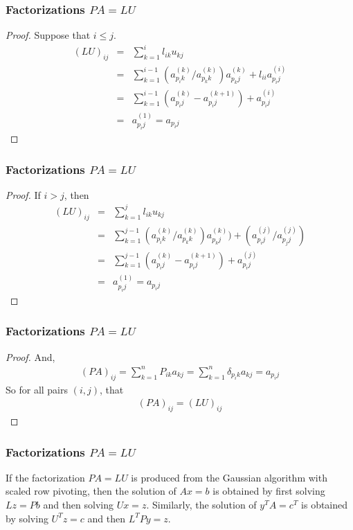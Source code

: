 \documentclass[notheorems,mathserif,table,compress]{beamer}  %
\begin{document}
\begin{frame}
\frametitle{Factorizations $PA=LU$} 
\begin{proof}
Suppose that $i\leq j$.
\begin{eqnarray*}
(LU)_{ij}&=&\sum_{k=1}^{i}l_{ik}u_{kj}\\
&=&\sum_{k=1}^{i-1}(a_{p_ik}^{(k)}/a_{p_kk}^{(k)})a_{p_kj}^{(k)}+l_{ii}a_{p_ij}^{(i)}\\
&=&\sum_{k=1}^{i-1}(a_{p_ij}^{(k)}-a_{p_ij}^{(k+1)})+a_{p_ij}^{(i)}\\
&=&a_{p_ij}^{(1)}=a_{p_ij}
\end{eqnarray*}
\end{proof}

\end{frame}

\begin{frame}
\frametitle{Factorizations $PA=LU$} 
\begin{proof}
If $i>j$, then 
\begin{eqnarray*}
(LU)_{ij}&=&\sum_{k=1}^{j}l_{ik}u_{kj}\\
&=&\sum_{k=1}^{j-1}(a_{p_ik}^{(k)}/a_{p_kk}^{(k)})a_{p_kj}^{(k)})+(a_{p_ij}^{(j)}/a_{p_jj}^{(j)})\\
&=&\sum_{k=1}^{j-1}(a_{p_ij}^{(k)}-a_{p_ij}^{(k+1)})+a_{p_ij}^{(j)}\\
&=&a_{p_ij}^{(1)}=a_{p_ij}
\end{eqnarray*}

\end{proof}
\end{frame}

\begin{frame}
\frametitle{Factorizations $PA=LU$} 
\begin{proof}
And,
\begin{eqnarray*}
(PA)_{ij}=\sum_{k=1}^nP_{ik}a_{kj}=\sum_{k=1}^n\delta_{p_ik}a_{kj}=a_{p_ij}
\end{eqnarray*}
So for all pairs $(i,j)$, that
\begin{eqnarray*}
(PA)_{ij}=(LU)_{ij}
\end{eqnarray*}
\end{proof}

\end{frame}

\begin{frame}
\frametitle{Factorizations $PA=LU$} 
\begin{theorem}[Theorem on Solving $PA=LU$]
If the factorization $PA=LU$ is produced from the Gaussian algorithm with scaled row pivoting, then the solution of $Ax=b$ is obtained by first solving $Lz=Pb$ and then solving $Ux=z$. Similarly, the solution of $y^TA=c^T$ is obtained by solving $U^Tz=c$ and then $L^TPy=z$.
\end{theorem}
\end{frame}
\end{document}
